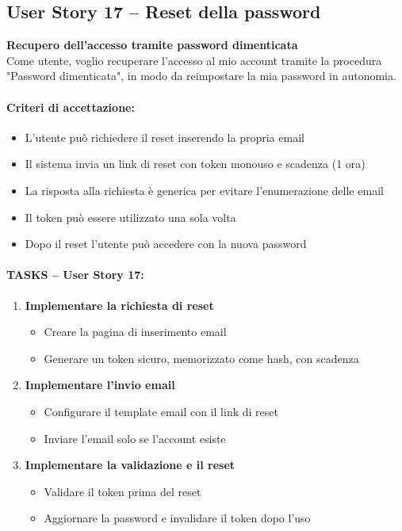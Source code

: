 \subsection{User Story 17 – Reset della password}
\label{us:resetPassword}

\textbf{Recupero dell'accesso tramite password dimenticata} \\
Come utente, voglio recuperare l'accesso al mio account tramite la procedura "Password dimenticata", in modo da reimpostare la mia password in autonomia.

\paragraph*{Criteri di accettazione:}
\begin{itemize}
    \item L'utente può richiedere il reset inserendo la propria email
    \item Il sistema invia un link di reset con token monouso e scadenza (1 ora)
    \item La risposta alla richiesta è generica per evitare l'enumerazione delle email
    \item Il token può essere utilizzato una sola volta
    \item Dopo il reset l'utente può accedere con la nuova password
\end{itemize}

\paragraph*{TASKS – User Story 17:}
\begin{enumerate}
    \item \textbf{Implementare la richiesta di reset}
    \begin{itemize}
        \item Creare la pagina di inserimento email
        \item Generare un token sicuro, memorizzato come hash, con scadenza
    \end{itemize}
    \item \textbf{Implementare l'invio email}
    \begin{itemize}
        \item Configurare il template email con il link di reset
        \item Inviare l'email solo se l'account esiste
    \end{itemize}
    \item \textbf{Implementare la validazione e il reset}
    \begin{itemize}
        \item Validare il token prima del reset
        \item Aggiornare la password e invalidare il token dopo l'uso
    \end{itemize}
\end{enumerate}



